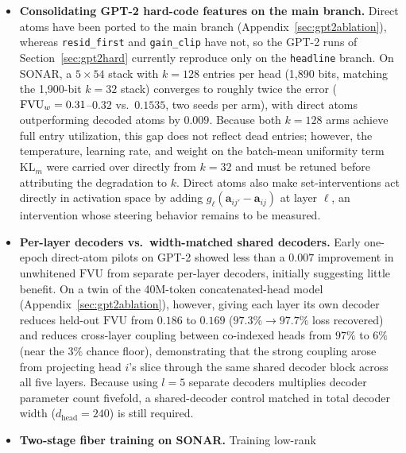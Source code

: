 \begin{itemize}
$k{=}128$, a dominant layer-0 head recurs at one third to one half of the
$k{=}32$ topic head's agreement); testing whether per-head router gains
drive agreement, since on GPT-2 adding a router doubles contribution
agreement while deactivating the final two layers; and training a
single-layer GPT-2 arm to replicate the size-matched comparison of
Section~\ref{sec:l0size} on a second substrate.
\item \textbf{Consolidating GPT-2 hard-code features on the main branch.}
Direct atoms have been ported to the main branch
(Appendix~\ref{sec:gpt2ablation}), whereas \texttt{resid\_first} and
\texttt{gain\_clip} have not, so the GPT-2 runs of
Section~\ref{sec:gpt2hard} currently reproduce only on the
\texttt{headline} branch. On SONAR, a $5\times54$ stack with $k{=}128$
entries per head (1{,}890 bits, matching the 1{,}900-bit $k{=}32$ stack)
converges to roughly twice the error ($\mathrm{FVU}_w = 0.31$--$0.32$ vs.\
$0.1535$, two seeds per arm), with direct atoms outperforming decoded
atoms by $0.009$. Because both $k{=}128$ arms achieve full entry
utilization, this gap does not reflect dead entries; however, the
temperature, learning rate, and weight on the batch-mean uniformity term
$\mathrm{KL}_m$ were carried over directly from $k{=}32$ and must be
retuned before attributing the degradation to $k$. Direct atoms also make
set-interventions act directly in activation space by adding
$g_\ell(\mathbf{a}_{ij'} - \mathbf{a}_{ij})$ at layer $\ell$, an
intervention whose steering behavior remains to be measured.
\item \textbf{Per-layer decoders vs.\ width-matched shared decoders.}
Early one-epoch direct-atom pilots on GPT-2 showed less than a $0.007$
improvement in unwhitened $\mathrm{FVU}$ from separate per-layer
decoders, initially suggesting little benefit. On a twin of the 40M-token
concatenated-head model (Appendix~\ref{sec:gpt2ablation}), however,
giving each layer its own decoder reduces held-out $\mathrm{FVU}$ from
$0.186$ to $0.169$ ($97.3\% \to 97.7\%$ loss recovered) and reduces
cross-layer coupling between co-indexed heads from $97\%$ to $6\%$ (near
the $3\%$ chance floor), demonstrating that the strong coupling arose
from projecting head $i$'s slice through the same shared decoder block
across all five layers. Because using $l{=}5$ separate decoders
multiplies decoder parameter count fivefold, a shared-decoder control
matched in total decoder width ($d_{\mathrm{head}}{=}240$) is still
required.
\item \textbf{Two-stage fiber training on SONAR.} Training low-rank

\end{itemize}

